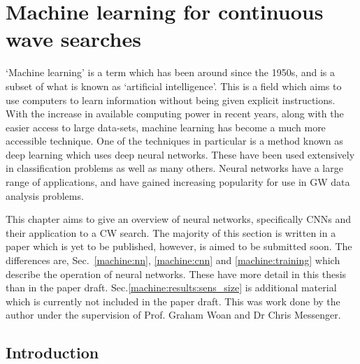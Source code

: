 \chapter[Machine learning for CWs]{\label{machine} Machine learning for continuous wave searches}


`Machine learning' is a term which has been around since the 1950s, and is a subset of what is known as `artificial intelligence'.
This is a field which aims to use computers to learn information without being given explicit instructions.
With the increase in available computing power in recent years, along with the easier access to large data-sets, machine learning has become a much more accessible technique.
One of the techniques in particular is a method known as deep learning which uses deep neural networks.
These have been used extensively in classification problems as well as many others.
Neural networks have a large range of applications, and have gained increasing popularity for use in \gls{GW} data analysis problems.

This chapter aims to give an overview of neural networks, specifically \glspl{CNN} and their application to a \gls{CW} search. 
The majority of this section is written in a paper which is yet to be published, however, is aimed to be submitted soon.
The differences are, Sec.~\ref{machine:nn}, \ref{machine:cnn} and \ref{machine:training} which describe the operation of neural networks. These have more detail in this thesis than in the paper draft. 
Sec.\ref{machine:results:sens_size} is additional material which is currently not included in the paper draft.
This was work done by the author under the supervision of Prof. Graham Woan and Dr Chris Messenger.

\section{\label{machine:intro} Introduction}

